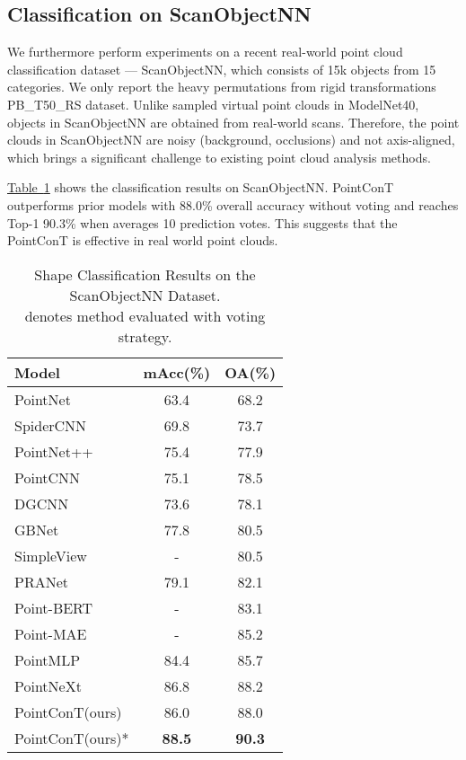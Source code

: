 \documentclass[lettersize,journal]{IEEEtran}
\begin{document}
\subsection{Classification on ScanObjectNN}
We furthermore perform experiments on a recent real-world point cloud classification dataset — ScanObjectNN\cite{scanobjectnn}, 
which consists of 15k objects from 15 categories. We only report the heavy permutations from rigid
transformations PB\_T50\_RS dataset.
Unlike sampled virtual point clouds in ModelNet40, objects in ScanObjectNN are obtained from real-world scans. 
Therefore, the point clouds in ScanObjectNN are noisy (background, occlusions) and not axis-aligned, 
which brings a significant challenge to existing point cloud analysis methods.

\hyperref[Table:cls2]{Table~\ref*{Table:cls2}} shows the classification results on ScanObjectNN. PointConT outperforms prior models with 88.0\% overall accuracy 
without voting\cite{rscnn} and reaches Top-1 90.3\%  when averages 10 prediction votes.  
This suggests that the PointConT is effective in real world point clouds. 

\begin{table}[h]
  \caption{Shape Classification Results on the ScanObjectNN Dataset. \protect\\
   denotes method evaluated with voting strategy\cite{rscnn}. \protect\\
  }
    \label{Table:cls2}
  \begin{center}
    \begin{tabular}{l|c|c}
    \toprule
    Model & mAcc(\%) & OA(\%) \\
    \midrule
    PointNet\cite{pointnet}  & 63.4 & 68.2\\
    SpiderCNN\cite{spidercnn} & 69.8 & 73.7\\
    PointNet++\cite{pointnet2} & 75.4 & 77.9\\
    PointCNN\cite{pointcnn} & 75.1 & 78.5\\
    DGCNN\cite{dgcnn} & 73.6 & 78.1\\
    GBNet\cite{GBNet}  & 77.8 & 80.5\\
    SimpleView\cite{simpleview}  & - & 80.5\\
    PRANet\cite{pranet} & 79.1 & 82.1\\
    Point-BERT\cite{pointbert}  & - & 83.1\\
    Point-MAE\cite{pointmae} & - & 85.2\\
    PointMLP\cite{pointmlp} & 84.4 & 85.7\\
    PointNeXt\cite{pointnext} & 86.8 & 88.2\\
    \midrule
    PointConT(ours) & 86.0 & 88.0\\
    PointConT(ours)* & \bfseries{88.5} & \bfseries{90.3}\\
    \bottomrule
    \end{tabular}
    \end{center}
\end{table}
\end{document}

